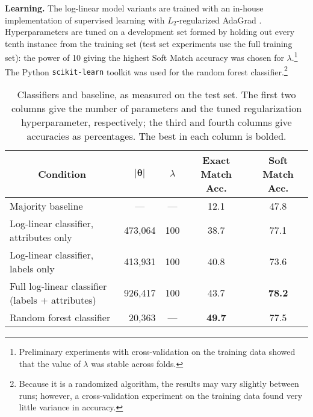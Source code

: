 \documentclass[11pt,letterpaper]{article}
\begin{document}
{\bf Learning.} The log-linear model variants are trained with an in-house implementation of supervised learning with $L_2$-regularized AdaGrad \citep{adagrad}.
Hyperparameters are tuned  
on a development set formed by holding out every tenth instance from the training set 
(test set experiments use the full training set):
the power of 10 giving the highest Soft Match accuracy was chosen for $\lambda$.\footnote{Preliminary experiments with cross-validation on the training data showed that the value of $\lambda$ was stable across folds.}
The Python {\tt scikit-learn} toolkit \citep{scikit-learn} was used for the random forest classifier.\footnote{Because it is a randomized algorithm, the results may vary slightly between runs; 
however, a cross-validation experiment on the training data found very little variance in accuracy.}


\begin{table*}[!htbp]\small\centering
\begin{tabular}{lrrcc}
\multicolumn{1}{c}{\bf Condition} & \multicolumn{1}{c}{$|\boldsymbol{\theta}|$} %
& \multicolumn{1}{c}{$\lambda$} 
& \multicolumn{1}{c}{\bf Exact Match Acc.} & \multicolumn{1}{c}{\bf Soft Match Acc.} 
\\
\midrule
Majority baseline & \multicolumn{1}{c}{---} & \multicolumn{1}{c}{---} %
& 12.1 & 47.8
\\
Log-linear classifier, attributes only & 473,064 & 100 & 38.7 & 77.1 \\
Log-linear classifier, labels only & 413,931 & 100 & 40.8 & 73.6  \\
Full log-linear classifier (labels + attributes) & 926,417 & 100 & 43.7 & \bf 78.2 \\
Random forest classifier & 20,363 & \multicolumn{1}{c}{---} & \bf 49.7 & 77.5 \\

\end{tabular}
\caption{Classifiers and baseline, as measured on the test set.
The first two columns give the number of parameters and the tuned regularization hyperparameter, respectively; 
the third and fourth columns give accuracies as percentages. The best in each column is bolded.}
\label{tbl:results}
\end{table*}
\end{document}
